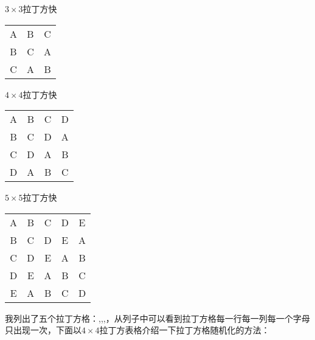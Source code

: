 \begin{margintable}
  \caption{$3\times 3$拉丁方快}
    \begin{tabular}{ccc}
    A  &  B  &  C\\
    B  &  C  &  A\\
    C  &  A  &  B\\
    \end{tabular}
\end{margintable}

\begin{margintable}
  \caption{$4\times 4$拉丁方快}
    \begin{tabular}{cccc}
    A     & B     & C     & D \\
    B     & C     & D     & A \\
    C     & D     & A     & B \\
    D     & A     & B     & C \\
    \end{tabular}
\end{margintable}

\begin{margintable}
  \caption{$5\times 5$拉丁方快}
    \begin{tabular}{ccccc}
    A     & B     & C     & D     & E \\
    B     & C     & D     & E     & A \\
    C     & D     & E     & A     & B \\
    D     & E     & A     & B     & C \\
    E     & A     & B     & C     & D \\
    \end{tabular}
\end{margintable}

我列出了五个拉丁方格：,,,，从列子中可以看到拉丁方格每一行每一列每一个字母只出现一次，下面以$4\times 4$拉丁方表格介绍一下拉丁方格随机化的方法：

